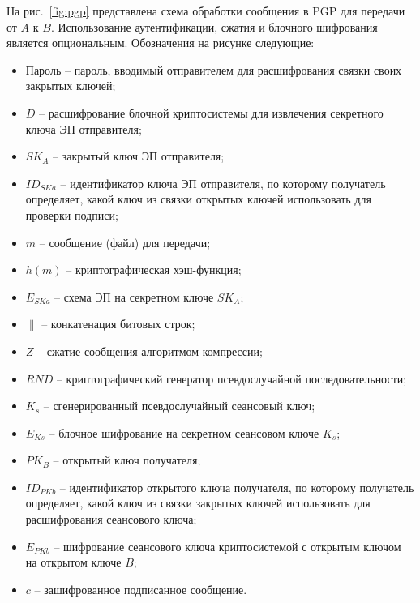 На рис.~\ref{fig:pgp} представлена схема обработки сообщения в PGP для передачи от $A$ к $B$. Использование аутентификации, сжатия и блочного шифрования является опциональным. Обозначения на рисунке следующие:
\begin{itemize}
    \item Пароль -- пароль, вводимый отправителем для расшифрования связки своих закрытых ключей;
    \item $D$ -- расшифрование блочной криптосистемы для извлечения секретного ключа ЭП отправителя;
    \item $SK_A$ -- закрытый ключ ЭП отправителя;
    \item $ID_{SKa}$ -- идентификатор ключа ЭП отправителя, по которому получатель определяет, какой ключ из связки открытых ключей использовать для проверки подписи;
    \item $m$ -- сообщение (файл) для передачи;
    \item $h(m)$ -- криптографическая хэш-функция;
    \item $E_{SKa}$ -- схема ЭП на секретном ключе $SK_A$;
    \item $\|$ -- конкатенация битовых строк;
    \item $Z$ -- сжатие сообщения алгоритмом компрессии;
    \item $RND$ -- криптографический генератор псевдослучайной последовательности;
    \item $K_s$ -- сгенерированный псевдослучайный сеансовый ключ;
    \item $E_{Ks}$ -- блочное шифрование на секретном сеансовом ключе $K_s$;
    \item $PK_B$ -- открытый ключ получателя;
    \item $ID_{PKb}$ -- идентификатор открытого ключа получателя, по которому получатель определяет, какой ключ из связки закрытых ключей использовать для расшифрования сеансового ключа;
    \item $E_{PKb}$ -- шифрование сеансового ключа криптосистемой с открытым ключом на открытом ключе $B$;
    \item $c$ -- зашифрованное подписанное сообщение.
\end{itemize}
